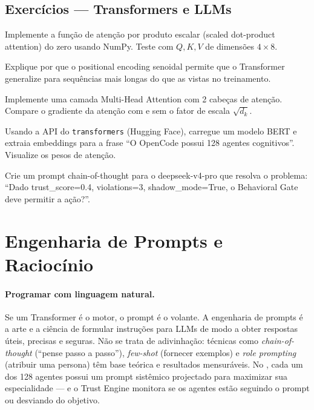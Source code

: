\subsection{Exercícios — Transformers e LLMs}
\begin{exercicio}
Implemente a função de atenção por produto escalar (scaled dot-product
attention) do zero usando NumPy. Teste com $Q, K, V$ de dimensões
$4 \times 8$.
\end{exercicio}
\begin{exercicio}
Explique por que o positional encoding senoidal permite que o Transformer
generalize para sequências mais longas do que as vistas no treinamento.
\end{exercicio}
\begin{exercicio}
Implemente uma camada Multi-Head Attention com 2 cabeças de atenção.
Compare o gradiente da atenção com e sem o fator de escala $\sqrt{d_k}$.
\end{exercicio}
\begin{exercicio}
Usando a API do \texttt{transformers} (Hugging Face), carregue um modelo
BERT e extraia embeddings para a frase ``O OpenCode possui 128 agentes
cognitivos''. Visualize os pesos de atenção.
\end{exercicio}
\begin{exercicio}
Crie um prompt chain-of-thought para o deepseek-v4-pro que resolva o
problema: ``Dado trust\_score=0.4, violations=3, shadow\_mode=True, o
Behavioral Gate deve permitir a ação?''.
\end{exercicio}
\section{Engenharia de Prompts e Raciocínio}
\label{sec:engenharia-prompts}
\nivelavancado

\paragraph{Programar com linguagem natural.} Se um Transformer é o motor, o
prompt é o volante. A engenharia de prompts é a arte e a ciência de
formular instruções para LLMs de modo a obter respostas úteis, precisas e
seguras. Não se trata de adivinhação: técnicas como \textit{chain-of-thought}
(``pense passo a passo''), \textit{few-shot} (fornecer exemplos) e
\textit{role prompting} (atribuir uma persona) têm base teórica e resultados
mensuráveis. No \opencodeeco{}, cada um dos 128 agentes possui um prompt
sistêmico projectado para maximizar sua especialidade --- e o Trust Engine
monitora se os agentes estão seguindo o prompt ou desviando do objetivo.

